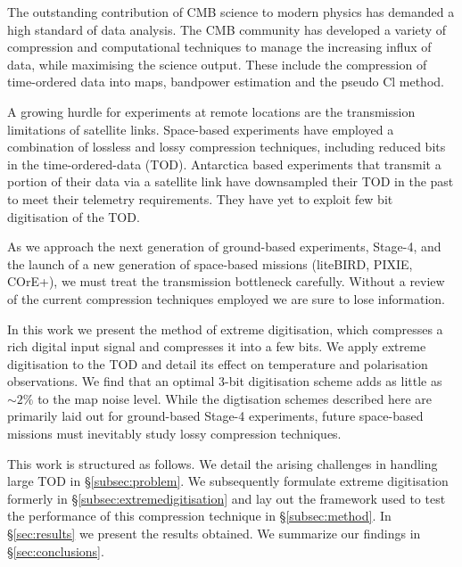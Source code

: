 \documentclass[apj]{emulateapj}
\begin{document}
The outstanding contribution of CMB science to modern physics has demanded a high standard of data analysis. The CMB community has developed a variety of compression and computational techniques to manage the increasing influx of data, while maximising the science output. These include the compression of time-ordered data into maps, bandpower estimation and the pseudo Cl method.

A growing hurdle for experiments at remote locations are the transmission limitations of satellite links. Space-based experiments have employed a combination of lossless and lossy compression techniques, including reduced bits in the time-ordered-data (TOD). Antarctica based experiments that transmit a portion of their data via a satellite link have downsampled their TOD in the past to meet their telemetry requirements. They have yet to exploit few bit digitisation of the TOD.

As we approach the next generation of ground-based experiments, Stage-4, and the launch of a new generation of space-based missions (liteBIRD, PIXIE, COrE+), we must treat the transmission bottleneck carefully. Without a review of the current compression techniques employed we are sure to lose information.

In this work we present the method of extreme digitisation, which compresses a rich digital input signal and compresses it into a few bits. We apply extreme digitisation to the TOD and detail its effect on temperature and polarisation observations. We find that an optimal 3-bit digitisation scheme adds as little as $\sim 2\%$ to the map noise level. While the digtisation schemes described here are primarily laid out for ground-based Stage-4 experiments, future space-based missions must inevitably study lossy compression techniques.

This work is structured as follows. We detail the arising challenges in handling large TOD in \S\ref{subsec:problem}. We subsequently formulate extreme digitisation formerly in \S\ref{subsec:extremedigitisation} and lay out the framework used to test the performance of this compression technique in \S\ref{subsec:method}. In \S\ref{sec:results} we present the results obtained. We summarize our findings in \S\ref{sec:conclusions}. 



\end{document}
